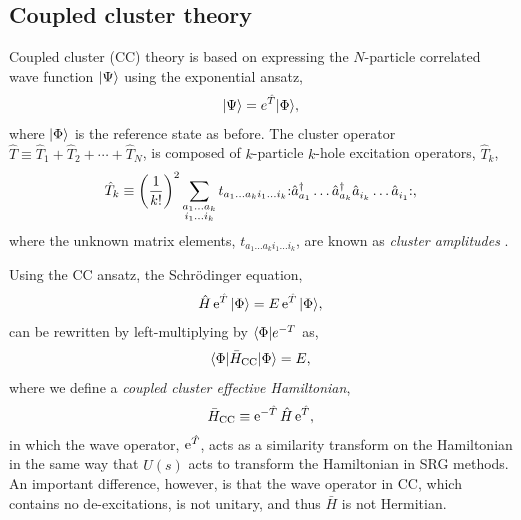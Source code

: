 \subsection{Coupled cluster theory}
\label{subsec:cctheory}

Coupled cluster (CC) theory is based on expressing the $N$-particle correlated wave function $| \Psi \rangle$ using the exponential ansatz,
\begin{align*}
  | \Psi \rangle = e^{\hat{T}} | \Phi \rangle,
\end{align*}
where $| \Phi \rangle$ is the reference state as before.  The cluster operator $\hat{T} \equiv \hat{T}_1 + \hat{T}_2 + \cdots + \hat{T}_N$, is composed of $k$-particle $k$-hole excitation operators, $\hat{T}_k$,
\begin{align} \label{eq:cc_amps}
  \hat{T}_k \equiv \left(\frac{1}{k!}\right)^2 \sum_{\substack{a_1 \ldots a_k \\ i_1 \ldots i_k}} t_{a_1 \ldots a_k i_1 \ldots i_k} \mathopen: \hat{a}_{a_1}^\dagger \ldots \hat{a}_{a_k}^\dagger \hat a_{i_k}^{} \ldots \hat{a}_{i_1}^{} \mathclose:,
\end{align}
where the unknown matrix elements, $t_{a_1 \ldots a_k i_1 \ldots i_k}$, are known as \textit{cluster amplitudes} \cite{shavitt2009many}.

Using the CC ansatz, the Schr\"odinger equation,
\begin{align} \label{eq:cc_schrodeq}
  \hat{H} \operatorname{e}^{\hat{T}} | \Phi \rangle = E \operatorname{e}^{\hat{T}} | \Phi \rangle,
\end{align}
can be rewritten by left-multiplying by $\langle \Phi |e^{-T}$ as,
\begin{align*}
  \langle \Phi | \bar{H}_{\mathrm{CC}} | \Phi \rangle = E,
\end{align*}
where we define a \textit{coupled cluster effective Hamiltonian},
\begin{align} \label{eq:cc_heff0}
  \bar{H}_{\mathrm{CC}} \equiv \operatorname{e}^{-\hat{T}} \hat{H} \operatorname{e}^{\hat{T}},
\end{align}
in which the wave operator, $\operatorname{e}^{\hat{T}}$, acts as a similarity transform on the Hamiltonian in the same way that $\hat{U}(s)$ acts to transform the Hamiltonian in SRG methods.  An important difference, however, is that the wave operator in CC, which contains no de-excitations, is not unitary, and thus $\bar{H}$ is not Hermitian.

